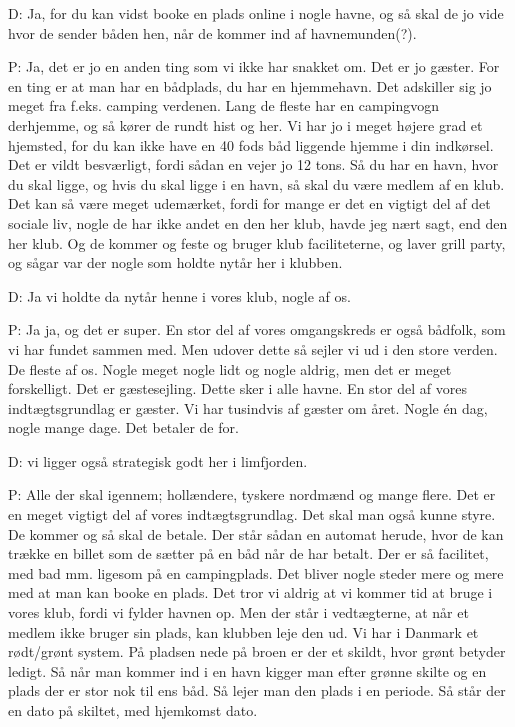 D: Ja, for du kan vidst booke en plads online i nogle havne, og så skal de jo vide hvor de sender båden hen, når de kommer ind af havnemunden(?).

P: Ja, det er jo en anden ting som vi ikke har snakket om. Det er jo gæster. For en ting er at man har en bådplads, du har en hjemmehavn. Det adskiller sig jo meget fra f.eks. camping verdenen. Lang de fleste har en campingvogn derhjemme, og så kører de rundt hist og her. Vi har jo i meget højere grad et hjemsted, for du kan ikke have en 40 fods båd liggende hjemme i din indkørsel. Det er vildt besværligt, fordi sådan en vejer jo 12 tons. Så du har en havn, hvor du skal ligge, og hvis du skal ligge i en havn, så skal du være medlem af en klub. Det kan så være meget udemærket, fordi for mange er det en vigtigt del af det sociale liv, nogle de har ikke andet en den her klub, havde jeg nært sagt, end den her klub. Og de kommer og feste og bruger klub faciliteterne, og laver grill party, og sågar var der nogle som holdte nytår her i klubben.

D: Ja vi holdte da nytår henne i vores klub, nogle af os.

P: Ja ja, og det er super. En stor del af vores omgangskreds er også bådfolk, som vi har fundet sammen med. Men udover dette så sejler vi ud i den store verden. De fleste af os. Nogle meget nogle lidt og nogle aldrig, men det er meget forskelligt. Det er gæstesejling. Dette sker i alle havne. En stor del af vores indtægtsgrundlag er gæster. Vi har tusindvis af gæster om året. Nogle én dag, nogle mange dage. Det betaler de for.

D: vi ligger også strategisk godt her i limfjorden.

P: Alle der skal igennem; hollændere, tyskere nordmænd og mange flere. Det er en meget vigtigt del af vores indtægtsgrundlag. Det skal man også kunne styre. De kommer og så skal de betale. Der står sådan en automat herude, hvor de kan trække en billet som de sætter på en båd når de har betalt. Der er så facilitet, med bad mm. ligesom på en campingplads. Det bliver nogle steder mere og mere med at man kan booke en plads. Det tror vi aldrig at vi kommer tid at bruge i vores klub, fordi vi fylder havnen op. Men der står i vedtægterne, at når et medlem ikke bruger sin plads, kan klubben leje den ud. Vi har i Danmark et rødt/grønt system. På pladsen nede på broen er der et skildt, hvor grønt betyder ledigt. Så når man kommer ind i en havn kigger man efter grønne skilte og en plads der er stor nok til ens båd. Så lejer man den plads i en periode. Så står der en dato på skiltet, med hjemkomst dato.

